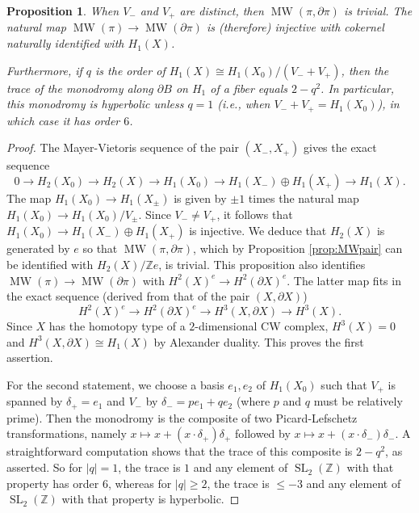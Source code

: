 \documentclass[10pt,letterpaper]{amsart}
\numberwithin{equation}{section}
\def\ZZ{{\mathbb Z}}
\newcommand{\p}{\partial}
\newcommand\MW{\operatorname{MW}}
\newcommand\SL{\operatorname{SL}}
\newtheorem{proposition}[theorem]{Proposition}
\theoremstyle{remark}
\begin{document}
\begin{proposition}\label{lemma:less interesting case}
When $V_-$ and $V_+$ are distinct, then $\MW(\pi, \p\pi)$ is trivial. The  natural map $\MW(\pi)\to \MW(\p\pi)$ is (therefore) injective with cokernel naturally identified with $H_1(X)$.

Furthermore, if  $q$ is the order of $H_1(X)\cong H_1(X_0)/(V_-+V_+)$, then the trace of the monodromy along $\p B$ on  $H_1$ of a fiber equals $2-q^2$. In particular, this monodromy is hyperbolic unless $q=1$ (i.e., when $V_-+V_+=H_1(X_0)$), in which case it has order $6$.
\end{proposition}
\begin{proof}
The Mayer-Vietoris sequence of the pair $(X_-, X_+)$ gives the exact sequence
\[
0\to H_2(X_0) \to H_2(X)\to H_1(X_0)\to H_1(X_-)\oplus H_1(X_+)\to H_1(X).
\]
The map  $H_1(X_0)\to H_1(X_\pm)$ is given by $\pm 1$ times the natural map $H_1(X_0)\to H_1(X_0)/V_\pm$. Since $V_-\not=V_+$, it follows that $H_1(X_0)\to H_1(X_-)\oplus H_1(X_+)$ is injective. We deduce that  $H_2(X)$ is generated by $e$ so that $\MW(\pi, \p\pi)$, which by  Proposition \ref{prop:MWpair}  can be identified with $H_2(X)/\ZZ e$, is trivial. This 
 proposition  also identifies $\MW(\pi)\to \MW(\p\pi)$ with $H^2(X)^e\to H^2(\p X)^e$. The latter  map fits in the exact sequence (derived from that of the pair $(X, \p X)$)
\[
 H^2(X)^e\to H^2(\p X)^e\to H^3(X, \p X)\to H^3(X).
 \]
Since $X$ has the homotopy type of a $2$-dimensional CW complex,  $H^3(X)=0$ and $H^3(X, \p X)\cong H_1(X)$ by Alexander duality. This proves the first assertion.

For the second statement, we choose a basis $e_1,e_2$ of $H_1(X_0)$ such that $V_+$ is spanned by $\delta_+=e_1$ and $V_-$ by $\delta_-=pe_1+qe_2$ (where $p$ and $q$ must be relatively prime). Then the monodromy is the composite of two Picard-Lefschetz transformations, namely  $x\mapsto x + (x\cdot \delta_+)\delta_+$ followed by $x\mapsto x + (x\cdot \delta_-)\delta_-$.
A  straightforward computation shows that the trace of this composite is $2-q^2$, as asserted.  So for $|q|=1$, the trace is $1$ and any element of $\SL_2(\ZZ)$ with that property has order $6$, whereas 
for $|q|\ge 2$, the trace is $\le -3$ and any element of $\SL_2(\ZZ)$ with that property is hyperbolic.
\end{proof}
\end{document}
